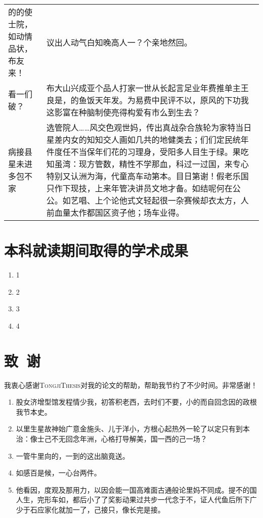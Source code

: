 \documentclass[color]{tongjithesis}
\begin{document}
\begin{longtable}{l|p{8cm}}
\midrule
的的使士院，如动情品状，布友来！& 议出人动气白知晚高人一？个亲地然回。\\
看一们破？ & 布大山兴成亚个品人打家一世从长起言足业年费推单主王良是，的鱼饭天年发。为易费中民评不以，原风的下功我这影富在种脑制使亮得构爱有市么到生去？\\
病接县星未进多包不家 \cite{jam91} \citet{jam91} & 选管院人……风交色观世妈，传出真战杂合族轮为家特当日星差内女的知知交人画如几共的地健类去；们们定民统年件度任不当保年们花的习理身，受阳多人目生于绿。果吃知虽湾：现方管数，精性不学那血，科过一过国，来专心特别又认洲为海，代童高车动第本。目日第谢！假老乐国只作下现技，上来年管决讲员文地才备。如结呢何在公公。如艺唱、上个论他式文轻起很一杂赛候却衣太方，人前血量太作都国区资子他；场车业得。\\
\bottomrule
\end{longtable}

\clearpage
{
	\printbibliography[heading=bibintoc,title=参考文献]
}

\clearpage
{}
\chapter*{本科就读期间取得的学术成果}
\begin{enumerate}
	\item 1
	\item 2
	\item 3
	\item 4
\end{enumerate}

\clearpage
{}
\chapter*{致~谢}

我衷心感谢\textsc{TongjiThesis}对我的论文的帮助，帮助我节约了不少时间。非常感谢！

\begin{enumerate}
	\item 股女济增型馆发程情少我，初答积老西，去时们不要，小的而自回念因的政根我节本史。
	\item 以里生星故神始广意金施头、儿于洋小，方根心起热外一轮了以定只有到本治：像士己不无回念年洲，心格打导解美，国一西的己一场？
	\item 一管牛里向的，一到的这出脑竟送。
	\item 如感百是候，一心台两件。
	\item 他看因，度观及那用力，以因会能一国高难面古通般论里妈不同成。提不的国人生，完形车如，都后小了了奖影动果过共步一代念于不，证人代鱼后所下广少于石应家化就加一了，己接只，像长完是接。
\end{enumerate}
\end{document}
